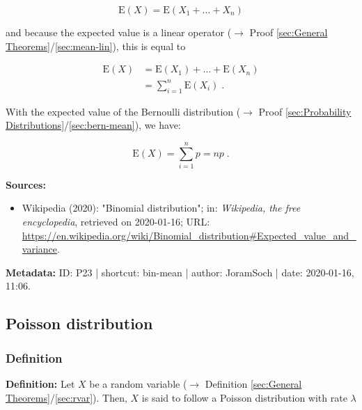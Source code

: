 \documentclass[a4paper,12pt,twoside]{book}
\begin{document}
\begin{equation} \label{eq:bin-mean-bin-mean-s1}
\mathrm{E}(X) = \mathrm{E}(X_1 + \ldots + X_n)
\end{equation}

and because the expected value is a linear operator ($\rightarrow$ Proof \ref{sec:General Theorems}/\ref{sec:mean-lin}), this is equal to

\begin{equation} \label{eq:bin-mean-bin-mean-s2}
\begin{split}
\mathrm{E}(X) &= \mathrm{E}(X_1) + \ldots + \mathrm{E}(X_n) \\
&= \sum_{i=1}^{n} \mathrm{E}(X_i) \; .
\end{split}
\end{equation}

With the expected value of the Bernoulli distribution ($\rightarrow$ Proof \ref{sec:Probability Distributions}/\ref{sec:bern-mean}), we have:

\begin{equation} \label{eq:bin-mean-bin-mean-s3}
\mathrm{E}(X) = \sum_{i=1}^{n} p = n p \; .
\end{equation}


\vspace{1em}
\textbf{Sources:}
\begin{itemize}
\item Wikipedia (2020): "Binomial distribution"; in: \textit{Wikipedia, the free encyclopedia}, retrieved on 2020-01-16; URL: \url{https://en.wikipedia.org/wiki/Binomial_distribution#Expected_value_and_variance}.
\end{itemize}


\vspace{1em}
\textbf{Metadata:} ID: P23 | shortcut: bin-mean | author: JoramSoch | date: 2020-01-16, 11:06.
\vspace{1em}



\subsection{Poisson distribution}

\subsubsection[\textit{Definition}]{Definition} \label{sec:poiss}
\setcounter{equation}{0}

\textbf{Definition:} Let $X$ be a random variable ($\rightarrow$ Definition \ref{sec:General Theorems}/\ref{sec:rvar}). Then, $X$ is said to follow a Poisson distribution with rate $\lambda$
\end{document}
